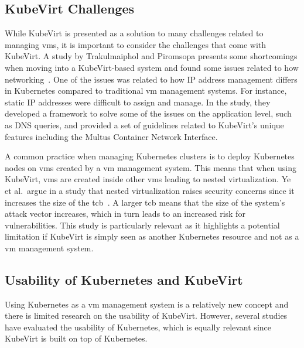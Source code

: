 \documentclass{kththesis}
\begin{document}
\subsection{KubeVirt Challenges}
While KubeVirt is presented as a solution to many challenges related to managing \Glspl{vm}, it is important to consider the challenges that come with KubeVirt. A study by Trakulmaiphol and Piromsopa presents some shortcomings when moving into a KubeVirt-based system and found some issues related to how networking\ \cite{kubevirt-migrate-issues}. One of the issues was related to how IP address management differs in Kubernetes compared to traditional \Gls{vm} management systems. For instance, static IP addresses were difficult to assign and manage. In the study, they developed a framework to solve some of the issues on the application level, such as DNS queries, and provided a set of guidelines related to KubeVirt's unique features including the Multus Container Network Interface. 

A common practice when managing Kubernetes clusters is to deploy Kubernetes nodes on \Glspl{vm} created by a \Gls{vm} management system. This means that when using KubeVirt, \Glspl{vm} are created inside other \Glspl{vm} leading to nested virtualization. Ye et al.\ argue in a study that nested virtualization raises security concerns since it increases the size of the \Gls{tcb}\ \cite{free-turtles}. A larger \Gls{tcb} means that the size of the system's attack vector increases, which in turn leads to an increased risk for vulnerabilities. This study is particularly relevant as it highlights a potential limitation if KubeVirt is simply seen as another Kubernetes resource and not as a \Gls{vm} management system. 

\subsection{Usability of Kubernetes and KubeVirt}
Using Kubernetes as a \Gls{vm} management system is a relatively new concept and there is limited research on the usability of KubeVirt. However, several studies have evaluated the usability of Kubernetes, which is equally relevant since KubeVirt is built on top of Kubernetes.
\end{document}
